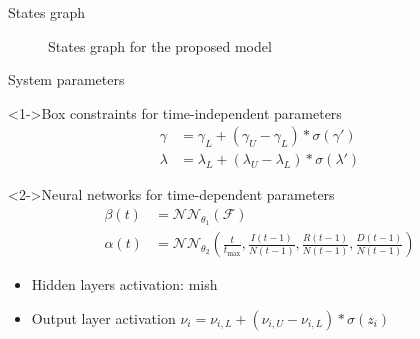\begin{frame}{States graph}
    \begin{figure}
        \centering
        \caption{States graph for the proposed model}
    \end{figure}
\end{frame}

\begin{frame}{System parameters}
    \begin{block}<1->{Box constraints for time-independent parameters}
        \begin{equation*}
            \begin{aligned}
                \gamma &= \gamma_L + (\gamma_U - \gamma_L) * \sigma (\gamma')\\
                \lambda &= \lambda_L + (\lambda_U - \lambda_L) * \sigma (\lambda')
            \end{aligned}
        \end{equation*}
    \end{block}

    \begin{block}<2->{Neural networks for time-dependent parameters}
        \begin{equation*}
            \begin{aligned}
                \beta(t) &= \mathcal{NN}_{\theta_1}(\mathcal{F}) \\
                \alpha(t) &= \mathcal{NN}_{\theta_2} (\frac{t}{t_\text{max}}, \frac{I(t-1)}{N(t-1)}, \frac{R(t-1)}{N(t-1)}, \frac{D(t-1)}{N(t-1)})
            \end{aligned}
        \end{equation*}
        \begin{itemize}
            \item Hidden layers activation: mish \cite{misraMishSelfRegularized2020}
            \item Output layer activation $\nu_i = \nu_{i,L} + (\nu_{i,U} - \nu_{i,L}) * \sigma (z_i)$
        \end{itemize}
    \end{block}
\end{frame}

